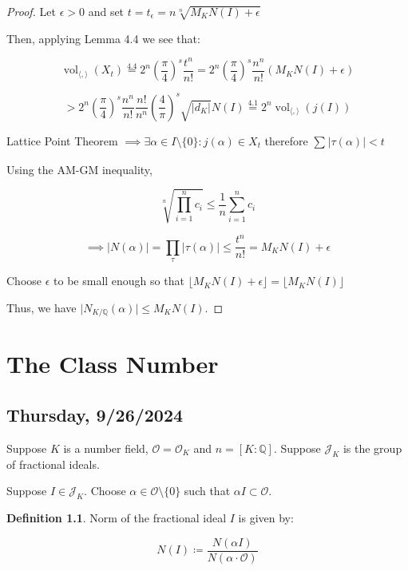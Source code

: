 \documentclass[openany]{amsbook}
\numberwithin{section}{chapter}
\theoremstyle{definition}
\newtheorem*{definition}{Definition}
\begin{document}
\begin{proof}
    Let \(\epsilon > 0\) and set \(t = t_{\epsilon} = n \sqrt[n]{M_K N(I) + \epsilon}\)
    
    Then, applying Lemma 4.4 we see that:

    \[
        \operatorname{vol}_{\langle , \rangle} (X_t) \overset{4.4}{=} 2^n \left( \frac{\pi}{4} \right)^ s \frac{t^n}{n!} = 2^n \left( \frac{\pi}{4} \right)^s \frac{n^n}{n!} (M_K N(I) + \epsilon)
    \]

    \[
        > 2^n \left( \frac{\pi}{4} \right)^s \frac{n^n}{n!} \frac{n!}{n^n} \left( \frac{4}{\pi} \right)^s \sqrt{\vert d_K \vert} N(I) \overset{4.1}{=} 2^n \operatorname{vol}_{\langle , \rangle}(j(I))
    \]

    Lattice Point Theorem \(\implies \exists \alpha \in I \setminus \{ 0 \} : j(\alpha) \in X_t\) therefore \(\sum_{} \vert \tau (\alpha) \vert < t\) 

    Using the AM-GM inequality,

    \[
        \sqrt[n]{\prod_{i=1}^n c_i} \leq \frac{1}{n} \sum_{i=1}^n c_i 
    \]

    \[
        \implies \vert N(\alpha) \vert = \prod_\tau \vert \tau(\alpha) \vert \leq \frac{t^n}{n!} = M_K N(I) + \epsilon 
    \]

    Choose \(\epsilon\) to be small enough so that \(\lfloor M_K N(I)+ \epsilon \rfloor = \lfloor M_K N(I) \rfloor\) 

    Thus, we have \(\vert N_{K / \mathbb{Q}}(\alpha) \vert \leq M_K N(I)\).
\end{proof}

\chapter{The Class Number}


\section*{Thursday, 9/26/2024}

Suppose \(K\) is a number field, \(\mathcal{O} = \mathcal{O}_K\) and \(n = [K:\mathbb{Q}]\). Suppose \(\mathcal{J}_K\) is the group of fractional ideals.

Suppose \(I \in \mathcal{J}_K\). Choose \(\alpha \in \mathcal{O} \setminus \{ 0 \} \) such that \(\alpha I \subset \mathcal{O}\).

\begin{definition}
    Norm of the fractional ideal \(I\) is given by:

    \[
        N(I) \coloneqq \frac{N(\alpha I)}{N(\alpha \cdot \mathcal{O})}
    \]
\end{definition}
\end{document}

